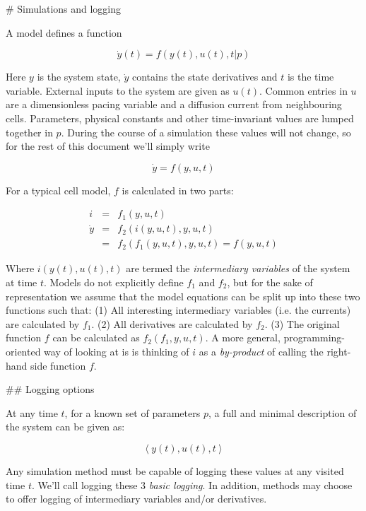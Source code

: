 # Simulations and logging

A model defines a function
\begin{linenomath}
\begin{equation}
\dot{y}\left(t\right)=f\left(y\left(t\right),u\left(t\right),t|p\right)
\end{equation}
\end{linenomath}
Here $y$ is the system state, $\dot{y}$ contains the state derivatives
and $t$ is the time variable. External inputs to the system are given
as $u\left(t\right)$. Common entries in $u$ are a dimensionless
pacing variable and a diffusion current from neighbouring cells. Parameters,
physical constants and other time-invariant values are lumped together
in $p$. During the course of a simulation these values will not change,
so for the rest of this document we'll simply write
\begin{linenomath}
\begin{equation}
\dot{y}=f\left(y,u,t\right)
\end{equation}
\end{linenomath}
For a typical cell model, $f$ is calculated in two parts:
\begin{linenomath}
\begin{eqnarray}
i & = & f_{1}\left(y,u,t\right)\\
\dot{y} & = & f_{2}\left(i\left(y,u,t\right),y,u,t\right)\\
 & = & f_{2}\left(f_{1}\left(y,u,t\right),y,u,t\right)=f\left(y,u,t\right)
\end{eqnarray}
\end{linenomath}
Where $i\left(y\left(t\right),u\left(t\right),t\right)$ are termed
the \emph{intermediary variables} of the system at time $t$. Models
do not explicitly define $f_{1}$ and $f_{2}$, but for the sake of
representation we assume that the model equations can be split up
into these two functions such that: (1) All interesting intermediary
variables (i.e. the currents) are calculated by $f_{1}$. (2) All
derivatives are calculated by $f_{2}$. (3) The original function
$f$ can be calculated as $f_{2}\left(f_{1},y,u,t\right)$. A more
general, programming-oriented way of looking at is is thinking of
$i$ as a \emph{by-product} of calling the right-hand side function
$f$.


## Logging options

At any time $t$, for a known set of parameters $p$, a full and minimal
description of the system can be given as:
\begin{linenomath}
\begin{equation}
\left\langle y\left(t\right),u\left(t\right),t\right\rangle
\end{equation}
\end{linenomath}
Any simulation method must be capable of logging these values at any
visited time $t$. We'll call logging these 3 \emph{basic logging}.
In addition, methods may choose to offer logging of intermediary variables
and/or derivatives.


